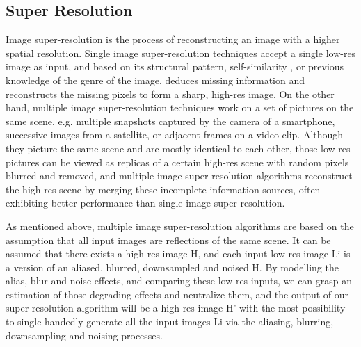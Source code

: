 \subsection{Super Resolution}
Image super-resolution is the process of reconstructing an image with a higher spatial resolution. Single image super-resolution techniques accept a single low-res image as input, and based on its structural pattern, self-similarity \cite{suetake2008image}, or previous knowledge of the genre of the image, deduces missing information and reconstructs the missing pixels to form a sharp, high-res image. On the other hand, multiple image super-resolution techniques work on a set of pictures on the same scene, e.g. multiple snapshots captured by the camera of a smartphone, successive images from a satellite, or adjacent frames on a video clip. Although they picture the same scene and are mostly identical to each other, those low-res pictures can be viewed as replicas of a certain high-res scene with random pixels blurred and removed, and multiple image super-resolution algorithms reconstruct the high-res scene by merging these incomplete information sources, often exhibiting better performance than single image super-resolution.

As mentioned above, multiple image super-resolution algorithms are based on the assumption that all input images are reflections of the same scene. It can be assumed that there exists a high-res image H, and each input low-res image Li is a version of an aliased, blurred, downsampled and noised H. By modelling the alias, blur and noise effects, and comparing these low-res inputs, we can grasp an estimation of those degrading effects and neutralize them, and the output of our super-resolution algorithm will be a high-res image H’ with the most possibility to single-handedly generate all the input images Li via the aliasing, blurring, downsampling and noising processes. 

